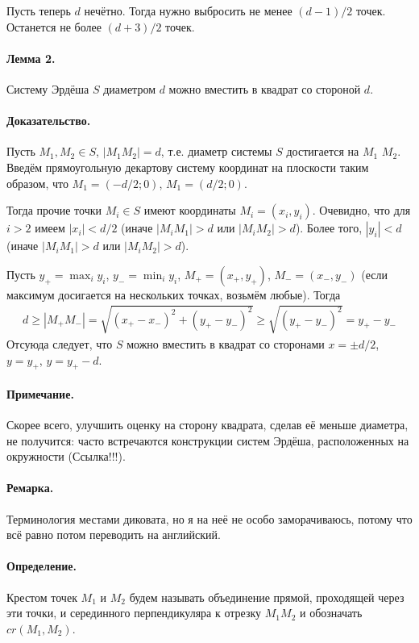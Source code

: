 Пусть теперь $d$ нечётно.
Тогда нужно выбросить не менее $(d-1)/2$ точек.
Останется не более $(d+3)/2$ точек.

\paragraph{Лемма 2.}
Систему Эрдёша $S$ диаметром $d$ можно вместить в квадрат со стороной $d$.

\paragraph{Доказательство.}
Пусть $M_1, M_2 \in S$, $|M_1 M_2| = d$,
т.е. диаметр системы $S$ достигается на $M_1$  $M_2$.
Введём прямоугольную декартову систему координат на плоскости таким образом, что
$M_1 = (-d/2; 0)$, $M_1 = (d/2; 0)$.

Тогда прочие точки $M_i \in S$ имеют координаты $M_i=(x_i, y_i)$.
Очевидно, что для $i>2$ имеем $|x_i| < d/2$
(иначе $|M_i M_1| > d$ или $|M_i M_2| > d$).
Более того, $|y_i| < d$ (иначе $|M_i M_1| > d$ или $|M_i M_2| > d$).

Пусть $y_+ = \max_{i} y_i$, $y_- = \min_{i} y_i$, $M_+=(x_+, y_+)$, $M_-=(x_-, y_-)$
(если максимум досигается на нескольких точках, возьмём любые).
Тогда
\begin{multline}
	d \geq |M_+ M_-| = \sqrt{(x_+ - x_-)^2 + (y_+ - y_-)^2}
	\geq \sqrt{(y_+ - y_-)^2} = y_+ - y_-
\end{multline}
Отсуюда следует, что $S$ можно вместить в квадрат со сторонами $x=\pm d/2$,
$y=y_+$, $y=y_+ - d$.

\paragraph{Примечание.}
Скорее всего, улучшить оценку на сторону квадрата, сделав её меньше диаметра,
не получится: часто встречаются конструкции систем Эрдёша, расположенных на окружности
(Ссылка!!!).

\paragraph{Ремарка.}
Терминология местами диковата,
но я на неё не особо заморачиваюсь,
потому что всё равно потом переводить на английский.

\paragraph{Определение.}
Крестом точек $M_1$ и $M_2$ будем называть объединение прямой,
проходящей через эти точки,
и серединного перпендикуляра к отрезку $M_1 M_2$
и обозначать $cr(M_1,M_2)$.

